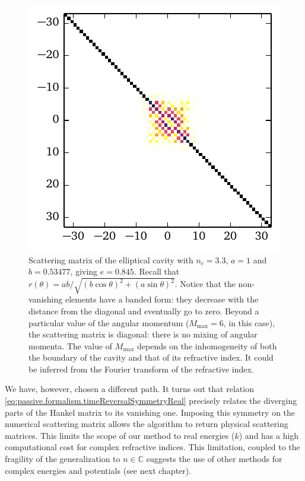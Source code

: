 \begin{figure}
 \centering
 \includegraphics{figs/passive/sMatrixEllipseMag.pdf}
 \caption[Banded form of the scattering matrix of the elliptical cavity]
	 {Scattering matrix of the elliptical cavity with $n_c=3.3$, $a=1$
	 and $b=0.53477$, giving $e=0.845$. Recall that $r(\theta)=ab/\sqrt{(b\cos\theta)^2+(a\sin\theta)^2}$.
	 Notice that the non-vanishing elements have a banded form: they decrease with the distance
	 from the diagonal and eventually go to zero. Beyond a particular value of the angular momentum 
	 ($M_\text{max}=6$, in this case), the scattering matrix is diagonal: there is no mixing of angular momenta.
	 The value of $M_\text{max}$ depends on the inhomogeneity of both the boundary of the cavity and that of its
	 refractive index. It could be inferred from the Fourier transform of the refractive index.}
 \label{fig:passive.numerical.bandedFormSmatrix}
\end{figure}

We have, however, chosen a different path. 
It turns out that relation \eqref{eq:passive.formalism.timeReversalSymmetryReal}
precisely relates the diverging parts of the Hankel matrix
to its vanishing one. Imposing this symmetry on the numerical scattering
matrix allows the algorithm to return physical scattering matrices. 
This limits the scope of our method to real energies ($k$) and has a
high computational cost for complex refractive indices. This limitation, 
coupled to the fragility of the generalization to $n\in\mathbb{C}$ suggests
the use of other methods for complex energies and potentials (see next chapter).

